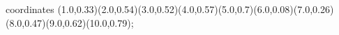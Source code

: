 					coordinates { (1.0,0.33)(2.0,0.54)(3.0,0.52)(4.0,0.57)(5.0,0.7)(6.0,0.08)(7.0,0.26)(8.0,0.47)(9.0,0.62)(10.0,0.79)};